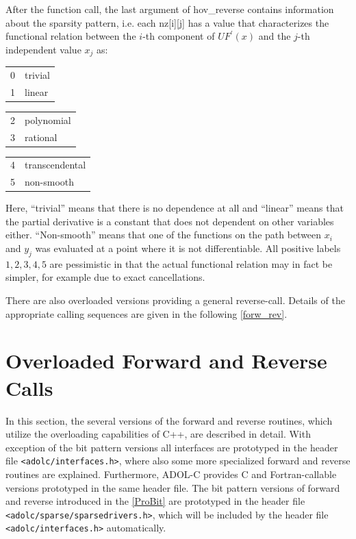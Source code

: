 \documentclass[11pt,twoside]{article}
\begin{document}
After the function call, the last argument of {\sf hov\_reverse} 
contains information about the sparsity pattern, i.e. each {\sf nz[i][j]}
has a value that characterizes the functional relation between the
$i$-th component of $UF^\prime(x)$ and the $j$-th independent value
$x_j$ as:
\begin{center}
\begin{tabular}{ll}
 0 & trivial \\
 1 & linear 
\end{tabular} \hspace*{4ex}
\begin{tabular}{ll}
 2 & polynomial\\
 3 & rational
\end{tabular} \hspace*{4ex}
\begin{tabular}{ll}
 4 & transcendental\\
 5 & non-smooth
\end{tabular}
\end{center}
Here, ``trivial'' means that there is no dependence at all and ``linear'' means
that the partial derivative is a constant that
does not dependent on other variables either. ``Non-smooth'' means that one of
the functions on the path between $x_i$ and $y_j$ was evaluated at a point 
where it is not differentiable.  All positive labels
$1, 2, 3, 4, 5$ are pessimistic in that the actual functional relation may
in fact be simpler, for example due to exact cancellations.  

There are also overloaded versions providing a general {\sf reverse}-call.
Details of the appropriate calling sequences are given in the following \autoref{forw_rev}.
%
\section{Overloaded Forward and Reverse Calls}
\label{forw_rev}
%
In this section, the several versions of the {\sf forward} and 
{\sf reverse} routines, which utilize the overloading capabilities
of C++, are described in detail. With exception of the bit pattern
versions all interfaces are prototyped in the header file 
\verb=<adolc/interfaces.h>=, where also some more specialized {\sf forward}
and {\sf reverse} routines are explained. Furthermore, \mbox{ADOL-C} provides
C and Fortran-callable versions prototyped in the same header file.
The bit pattern versions of {\sf forward} and {\sf reverse} introduced
in the \autoref{ProBit} are prototyped in the header file
\verb=<adolc/sparse/sparsedrivers.h>=, which will be included by the header 
file \verb=<adolc/interfaces.h>= automatically.
%
\end{document}
